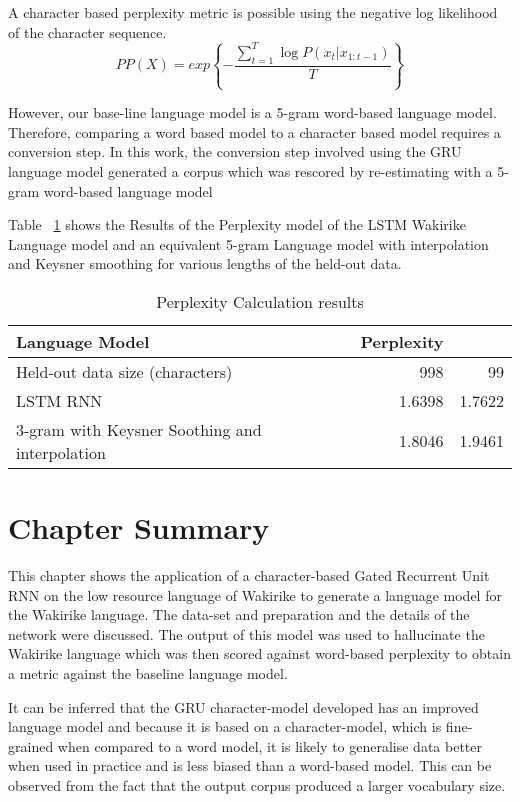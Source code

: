 A character based perplexity metric is possible using  the negative log likelihood of the character sequence.
\begin{equation}
    PP(X)=exp\left\{−\frac{\sum_{t=1}^T\log P(x_t|x_{1:t−1})}{T}\right\}
\label{ch5_eq3_ppx}
\end{equation}

However, our base-line language model is a 5-gram word-based language model.  Therefore, comparing a word based model to a character based model requires a conversion step. In this work, the conversion step involved using the GRU language model generated a corpus which was rescored by re-estimating with a 5-gram word-based language model

Table ~\ref{tab:example} shows the Results of the Perplexity model of the LSTM Wakirike Language model and an equivalent 5-gram Language model with interpolation and Keysner smoothing \citep{Heafield-estimate} for various lengths of the held-out data.


\begin{table}
  \caption{Perplexity Calculation results}
  \label{tab:example}
\begin{tabular}{lrr}
\toprule
Language Model & Perplexity  \\
\midrule
Held-out data size (characters) & 998 & 99\\
\midrule
LSTM RNN & 1.6398 & 1.7622\\
3-gram with Keysner Soothing and interpolation & 1.8046 & 1.9461\\
\bottomrule
\end{tabular}
\end{table}
\section{Chapter Summary}
This chapter shows the application of a character-based Gated Recurrent Unit RNN on the low resource language of Wakirike to generate a language model for the Wakirike language.  The data-set and preparation and the details of the network were discussed.  The output of this model was used to hallucinate the Wakirike language which was then scored against word-based perplexity to obtain a metric against the baseline language model.

It can be inferred that the GRU character-model developed has an improved language model and because it is based on a character-model, which is fine-grained when compared to a word model, it is likely to generalise data better when used in practice and is less biased than a word-based model.  This can be observed from the fact that the output corpus produced a larger vocabulary size.
